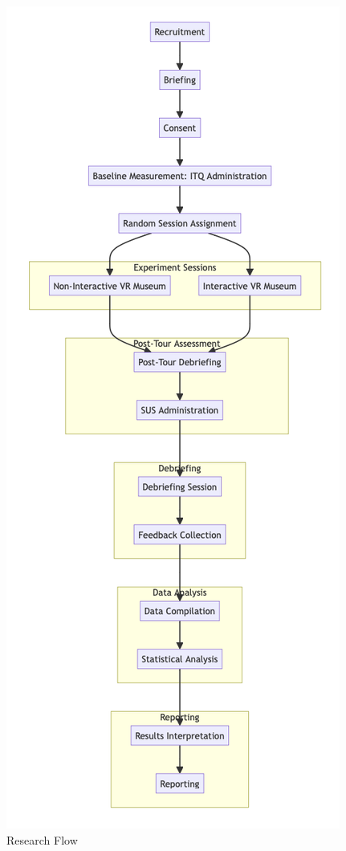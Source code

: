 \documentclass[conference]{IEEEtran}
\begin{document}
\begin{figure}[htbp]
    \centering
    \includegraphics[scale=0.8]{Report/img/methodology.png}
    \caption{Research Flow}
    \label{fig:researchflowchart}
\end{figure}
\end{document}
